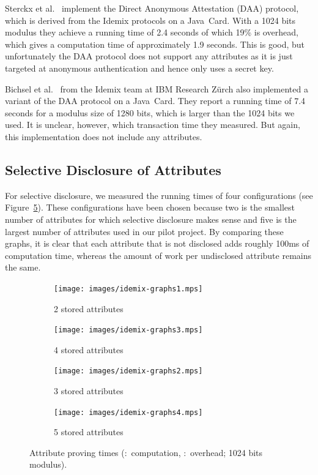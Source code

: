 Sterckx et al.~\cite{Sterckx09} implement the Direct Anonymous Attestation (DAA)
protocol, which is derived from the Idemix protocols on a Java~Card. With a
1024 bits modulus they achieve a running time of 2.4 seconds of which 19\% is
overhead, which gives a computation time of approximately 1.9 seconds. This is
good, but unfortunately the DAA protocol does not support any attributes as it
is just targeted at anonymous authentication and hence only uses a secret key.

Bichsel et al.~\cite{BichselCGS2009} from the Idemix team at IBM Research
Z\"urch also implemented a variant of the DAA protocol on a Java~Card. They
report a running time of 7.4 seconds for a modulus size of 1280 bits, which is
larger than the 1024 bits we used. It is unclear, however, which transaction
time they measured. But again, this implementation does not include any
attributes.

\subsection{Selective Disclosure of Attributes}

For selective disclosure, we measured the running times of four configurations
(see Figure~\ref{fig:proving}). These configurations have been chosen because
two is the smallest number of attributes for which selective disclosure makes
sense and five is the largest number of attributes used in our pilot project.
By comparing these graphs, it is clear that each attribute that is not disclosed
adds roughly 100ms of computation time, whereas the amount of work per
undisclosed attribute remains the same.

\begin{figure}
  \centering
  \begin{subfigure}[b]{0.45\textwidth}
    \texttt{[image: images/idemix-graphs1.mps]}
    \caption{2 stored attributes}
    \label{fig:2attr-sle78}
  \end{subfigure}
  \begin{subfigure}[b]{0.45\textwidth}
    \texttt{[image: images/idemix-graphs3.mps]}
    \caption{4 stored attributes}
    \label{fig:4attr-sle78}
  \end{subfigure}

  \begin{subfigure}[b]{0.45\textwidth}
    \texttt{[image: images/idemix-graphs2.mps]}
    \caption{3 stored attributes}
    \label{fig:3attr-sle78}
  \end{subfigure}
  \begin{subfigure}[b]{0.45\textwidth}
    \texttt{[image: images/idemix-graphs4.mps]}
    \caption{5 stored attributes}
    \label{fig:5attr-sle78}
  \end{subfigure}
  \caption[Attribute proving times.]{
    Attribute proving times
    (:~computation,
      :~overhead; 1024 bits modulus).}
  \label{fig:proving}
\end{figure}

